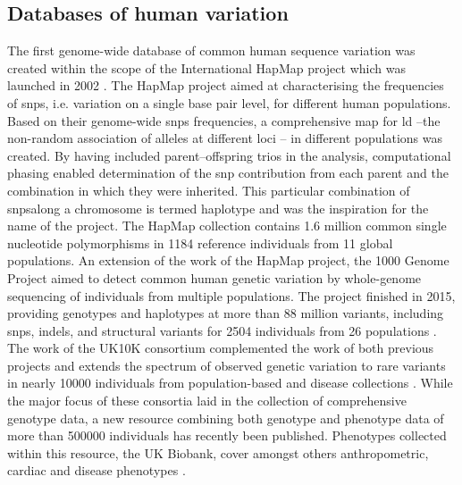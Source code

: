 \subsection{Databases of human variation}
\label{subsection:databases}
The first genome-wide database of common human sequence variation was created within the scope of the International HapMap project which was launched in 2002 \citep{HapMap2005,HapMap2007,HapMap2010}.
The HapMap project aimed at characterising the frequencies of \glspl{snp}, i.e. variation on a single base pair level, for different human populations. Based on their genome-wide \glspl{snp} frequencies, a comprehensive map for \gls{ld}  --the non-random association of alleles at different loci \citep{Lewontin1960}-- in different populations was created. By having included parent–offspring trios in the analysis, computational phasing \citep{Stephens2001} enabled determination of the \gls{snp} contribution from each parent and the combination in which they were inherited. This particular combination of \glspl{snp}along a chromosome is termed haplotype and was the inspiration for the name of the project. The HapMap collection contains 1.6 million common single nucleotide polymorphisms in \num{1184} reference individuals from 11 global populations. An extension of the work of the HapMap project, the 1000 Genome Project aimed to detect common human genetic variation by whole-genome sequencing of individuals from multiple populations. The project finished in 2015, providing genotypes and haplotypes at more than 88 million variants, including \glspl{snp}, \glspl{indel}, and structural variants for \num{2504} individuals from 26 populations \citep{1000Genomes2011,1000Genomes2012,1000Genomes2015}. The work of the UK10K consortium complemented the work of both previous projects and extends the spectrum of observed genetic variation to rare variants in nearly \num{10000} individuals from population-based and disease collections \citep{UK10KConsortium2015}. While the major focus of these consortia laid in the collection of comprehensive genotype data, a new resource combining both genotype and phenotype data of more than \num{500000} individuals has recently been published. Phenotypes collected within this resource, the UK Biobank, cover amongst others anthropometric, cardiac and disease phenotypes \citep{Sudlow2015}.

